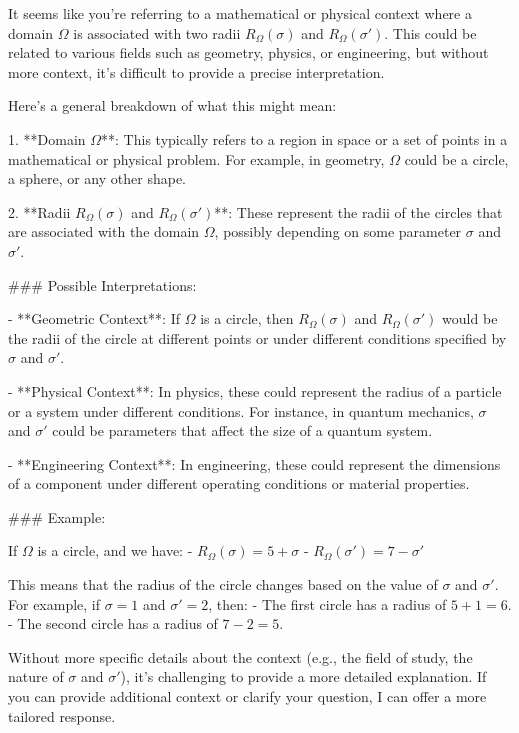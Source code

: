 It seems like you're referring to a mathematical or physical context where a domain \(\Omega\) is associated with two radii \(R_\Omega(\sigma)\) and \(R_\Omega(\sigma')\). This could be related to various fields such as geometry, physics, or engineering, but without more context, it's difficult to provide a precise interpretation.

Here’s a general breakdown of what this might mean:

1. **Domain \(\Omega\)**: This typically refers to a region in space or a set of points in a mathematical or physical problem. For example, in geometry, \(\Omega\) could be a circle, a sphere, or any other shape.

2. **Radii \(R_\Omega(\sigma)\) and \(R_\Omega(\sigma')\)**: These represent the radii of the circles that are associated with the domain \(\Omega\), possibly depending on some parameter \(\sigma\) and \(\sigma'\).

### Possible Interpretations:

- **Geometric Context**: If \(\Omega\) is a circle, then \(R_\Omega(\sigma)\) and \(R_\Omega(\sigma')\) would be the radii of the circle at different points or under different conditions specified by \(\sigma\) and \(\sigma'\).

- **Physical Context**: In physics, these could represent the radius of a particle or a system under different conditions. For instance, in quantum mechanics, \(\sigma\) and \(\sigma'\) could be parameters that affect the size of a quantum system.

- **Engineering Context**: In engineering, these could represent the dimensions of a component under different operating conditions or material properties.

### Example:

If \(\Omega\) is a circle, and we have:
- \(R_\Omega(\sigma) = 5 + \sigma\)
- \(R_\Omega(\sigma') = 7 - \sigma'\)

This means that the radius of the circle changes based on the value of \(\sigma\) and \(\sigma'\). For example, if \(\sigma = 1\) and \(\sigma' = 2\), then:
- The first circle has a radius of \(5 + 1 = 6\).
- The second circle has a radius of \(7 - 2 = 5\).

Without more specific details about the context (e.g., the field of study, the nature of \(\sigma\) and \(\sigma'\)), it's challenging to provide a more detailed explanation. If you can provide additional context or clarify your question, I can offer a more tailored response.